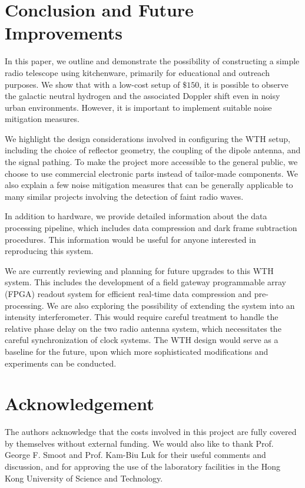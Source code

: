 \documentclass[12pt]{article}
\begin{document}
    \section{Conclusion and Future Improvements} \label{sect: conclusion}
    In this paper, we outline and demonstrate the possibility of constructing a simple radio telescope using kitchenware, primarily for educational and outreach purposes. We show that with a low-cost setup of $\$150$, it is possible to observe the galactic neutral hydrogen and the associated Doppler shift even in noisy urban environments. 
    However, it is important to implement suitable noise mitigation measures.

    We highlight the design considerations involved in configuring the WTH setup, including the choice of reflector geometry, the coupling of the dipole antenna, and the signal pathing. 
    To make the project more accessible to the general public, we choose to use commercial electronic parts instead of tailor-made components. 
    We also explain a few noise mitigation measures that can be generally applicable to many similar projects involving the detection of faint radio waves.
    
    In addition to hardware, we provide detailed information about the data processing pipeline, which includes data compression and dark frame subtraction procedures. This information would be useful for anyone interested in reproducing this system.
    
    We are currently reviewing and planning for future upgrades to this WTH system. This includes the development of a field gateway programmable array (FPGA) readout system for efficient real-time data compression and pre-processing.
    We are also exploring the possibility of extending the system into an intensity interferometer. 
    This would require careful treatment to handle the relative phase delay on the two radio antenna system, which necessitates the careful synchronization of clock systems. 
    The WTH design would serve as a baseline for the future, upon which more sophisticated modifications and experiments can be conducted.

    \section*{Acknowledgement}
    The authors acknowledge that the costs involved in this project are fully covered by themselves without external funding. We would also like to thank Prof. George F. Smoot and Prof. Kam-Biu Luk for their useful comments and discussion, and for approving the use of the laboratory facilities in the Hong Kong University of Science and Technology.
    
\end{document}
